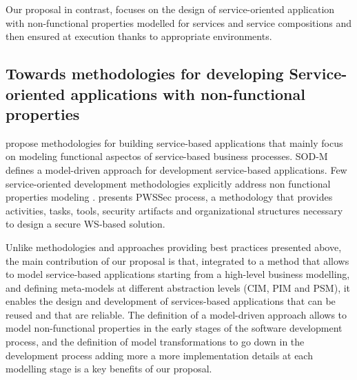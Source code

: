 

Our proposal in contrast, focuses on the design of service-oriented application with non-functional properties modelled  for services and service compositions and then ensured at execution thanks to appropriate environments.


\subsection{Towards methodologies for developing Service-oriented applications   with non-func\-tion\-al properties}

 \cite{Ramollari_asurvey,PapazoglouH06,FeuerlichtM05,soma,Arsanjani:2008} propose methodologies for building service-based applications that  mainly focus on modeling functional aspectos of service-based business processes. SOD-M \cite{decastro1} defines a model-driven approach for development service-based applications. 
Few service-oriented development methodologies    explicitly address  non functional properties modeling \cite{Tran2012531,GutierrezRF10}. \cite{GutierrezRF10} presents PWSSec process, a methodology that provides  activities, tasks, tools, security artifacts and organizational structures necessary to design a secure WS-based solution. 



Unlike methodologies and approaches providing best practices presented above, the main contribution of our proposal is that, integrated to a method that allows to model service-based applications starting from a high-level business modelling, and defining meta-models at different abstraction levels (CIM, PIM and PSM), it enables the design and development of services-based applications that can be reused and that are reliable. The definition of a model-driven approach  allows to model non-functional properties in the early stages of the software development process, and the definition of model transformations to go down in the development process adding more a more implementation details at each modelling stage is a key benefits of our proposal.

